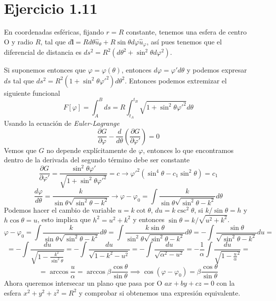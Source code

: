 \section{Ejercicio 1.11}


En coordenadas esféricas, fijando $r=R$ constante, tenemos una esfera de centro O y radio $R$, tal que $d\mathbf{l}=Rd\theta \hat{u}_{\theta}+R\sin{\theta} d\varphi \hat{u}_{\varphi}$, así pues tenemos que el diferencial de distancia es $ds^2=R^2(d\theta^2+\sin^2{\theta}d\varphi^2)$.

Si suponemos entonces que $\varphi = \varphi(\theta)$, entonces $d\varphi = \varphi' d\theta$ y podemos expresar $ds$ tal que $ds^2 = R^2(1+\sin^2{\theta}\varphi'^2)d\theta^2$.
Entonces podemos extremizar el siguiente funcional
\[F[\varphi]=\int_A^B{ds}=R\int_{t_A}^{t_B}{\sqrt{1+\sin^2{\theta}\varphi'^2}d\theta}\]
Usando la ecuación de \textit{Euler-Lagrange}
\[\frac{\partial G}{\partial \varphi}-\frac{d}{d\theta}\left(\frac{\partial G}{\partial \varphi'}\right)=0\]
Vemos que $G$ no depende explícitamente de $\varphi$, entonces lo que encontramos dentro de la derivada del segundo término debe ser constante
\[\frac{\partial G}{\partial \varphi'}=\frac{\sin^2{\theta}\varphi'}{\sqrt{1+\sin^2{\theta}\varphi'^2}}=c \rightarrow \varphi'^2(\sin^4{\theta}-c_1\sin^2{\theta})=c_1\]
\[\frac{d\varphi}{d \theta} = \frac{k}{\sin{\theta}\sqrt{\sin^2{\theta}-k^2}} \rightarrow \varphi -\varphi_0= \int{\frac{k}{\sin{\theta}\sqrt{\sin^2{\theta}-k^2}}d\theta}\]
Podemos hacer el cambio de variable $u=k \cot{\theta}$, $du=k\csc^2{\theta}$, si $k/\sin{\theta}=h$ y $h\cos{\theta}=u$, esto implica que $h^2=u^2+k^2$ y entonces $\sin{\theta}=k/\sqrt{u^2+k^2}$.
\[\varphi -\varphi_0= \int{\frac{k}{\sin{\theta}\sqrt{\sin^2{\theta}-k^2}}d\theta}=\int{\frac{k\sin{\theta}}{\sin^2{\theta}\sqrt{\sin^2{\theta}-k^2}}d\theta}=-\int{\frac{\sin{\theta}}{\sqrt{\sin^2{\theta}-k^2}}du}=\]
\[=-\int{\frac{du}{\sqrt{1-\frac{k^2}{\sin^2{\theta}}}}}=-\int{\frac{du}{\sqrt{1-k^2-u^2}}}=-\int{\frac{du}{\sqrt{\alpha^2-u^2}}}=-\frac{1}{\alpha}\int{\frac{du}{\sqrt{1-\frac{u}{\alpha}^2}}}=\]
\[=\arccos{\frac{u}{\alpha}}=\arccos{\beta \frac{\cos\theta}{\sin\theta}}\implies \cos({\varphi -\varphi_0})=\beta \frac{\cos\theta}{\sin\theta}\]
Ahora queremos intersecar un plano que pasa por O $ax+by+cz=0$ con la esfera $x^2+y^2+z^2=R^2$ y comprobar si obtenemos una expresión equivalente.

